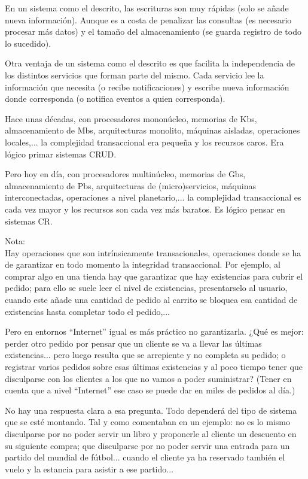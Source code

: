 \documentclass[spanish,12pt,a4paper,final,oneside]{book}
\begin{document}
En un sistema como el descrito, las escrituras son muy rápidas (solo se añade nueva información). Aunque es a costa de penalizar las consultas (es necesario procesar más datos) y el tamaño del almacenamiento (se guarda registro de todo lo sucedido).

Otra ventaja de un sistema como el descrito es que facilita la independencia de los distintos servicios que forman parte del mismo. Cada servicio lee la información que necesita (o recibe notificaciones) y escribe nueva información donde corresponda (o notifica eventos a quien corresponda).


Hace unas décadas, con procesadores mononúcleo, memorias de Kbs, almacenamiento de Mbs, arquitecturas monolito, máquinas aisladas, operaciones locales,... la complejidad transaccional era pequeña y los recursos caros. Era lógico primar sistemas CRUD.

Pero hoy en día, con procesadores multinúcleo, memorias de Gbs, almacenamiento de Pbs, arquitecturas de (micro)servicios, máquinas interconectadas, operaciones a nivel planetario,... la complejidad transaccional es cada vez mayor y los recursos son cada vez más baratos. Es lógico pensar en sistemas CR.

\vspace{1cm}
Nota: 
\\Hay operaciones que son intrínsicamente transacionales, operaciones donde se ha de garantizar en todo momento la integridad transaccional. Por ejemplo, al comprar algo en una tienda hay que garantizar que hay existencias para cubrir el pedido; para ello se suele leer el nivel de existencias, presentarselo al usuario, cuando este añade una cantidad de pedido al carrito se bloquea esa cantidad de existencias hasta completar todo el pedido,...
 
Pero en entornos ``Internet'' igual es más práctico no garantizarla. ¿Qué es mejor: perder otro pedido por pensar que un cliente se va a llevar las últimas existencias... pero luego resulta que se arrepiente y no completa su pedido; o registrar varios pedidos sobre esas últimas existencias y al poco tiempo tener que disculparse con los clientes a los que no vamos a poder suministrar?  (Tener en cuenta que a nivel ``Internet'' ese caso se puede dar en miles de pedidos al día.)

No hay una respuesta clara a esa pregunta. Todo dependerá del tipo de sistema que se esté montando. Tal y como comentaban en un ejemplo: no es lo mismo disculparse por no poder servir un libro y proponerle al cliente un descuento en su siguiente compra; que disculparse por no poder servir una entrada para un partido del mundial de fútbol... cuando el cliente ya ha reservado también el vuelo y la estancia para asistir a ese partido...
\end{document}
